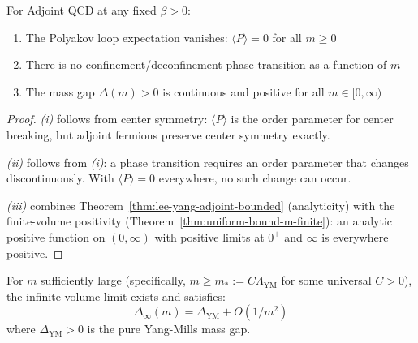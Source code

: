 \begin{corollary}
\label{cor:center-no-phase}
For Adjoint QCD at any fixed $\beta > 0$:
\begin{enumerate}[label=(\roman*)]
\item The Polyakov loop expectation vanishes: $\langle P \rangle = 0$ for all $m \geq 0$
\item There is no confinement/deconfinement phase transition as a function of $m$
\item The mass gap $\Delta(m) > 0$ is continuous and positive for all $m \in [0, \infty)$
\end{enumerate}
\end{corollary}

\begin{proof}
\textit{(i)} follows from center symmetry: $\langle P \rangle$ is the order parameter 
for center breaking, but adjoint fermions preserve center symmetry exactly.

\textit{(ii)} follows from \textit{(i)}: a phase transition requires an order parameter 
that changes discontinuously. With $\langle P \rangle = 0$ everywhere, no such change 
can occur.

\textit{(iii)} combines Theorem~\ref{thm:lee-yang-adjoint-bounded} (analyticity) with 
the finite-volume positivity (Theorem~\ref{thm:uniform-bound-m-finite}): an analytic 
positive function on $(0, \infty)$ with positive limits at $0^+$ and $\infty$ is 
everywhere positive.
\end{proof}

\begin{proposition}
\label{prop:decoupling-rigorous}
For $m$ sufficiently large (specifically, $m \geq m_* := C \Lambda_{\text{YM}}$ for 
some universal $C > 0$), the infinite-volume limit exists and satisfies:
\[
\Delta_\infty(m) = \Delta_{\text{YM}} + O(1/m^2)
\]
where $\Delta_{\text{YM}} > 0$ is the pure Yang-Mills mass gap.
\end{proposition}

